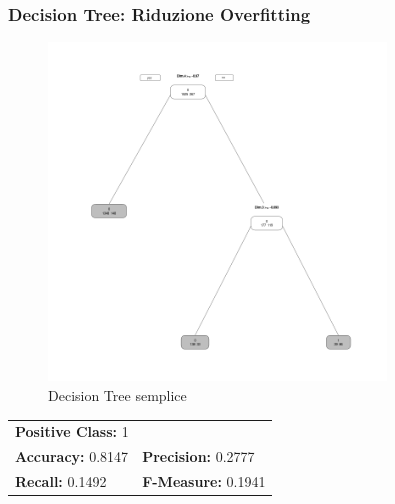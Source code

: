 \begin{frame}[fragile]
\frametitle{Decision Tree: Riduzione Overfitting}
\begin{minipage}{0.45\textwidth}
\begin{figure}
    \centering
    \includegraphics[width=0.8\textwidth]{Img/decision tree/D-TREE002.png}
    \caption{Decision Tree semplice}
    \label{fig:DTREE2}
\end{figure}
\end{minipage}%
\hspace{2em}
\begin{minipage}{0.45\textwidth}

\begin{table}[h!]
\centering
\begin{tabular}{ll}
\multicolumn{2}{l}{\textbf{Positive Class:} 1} \\
\textbf{Accuracy:} 0.8147 & \textbf{Precision:} 0.2777\\
\textbf{Recall:} 0.1492 & \textbf{F-Measure:} 0.1941
\end{tabular}
\end{table}

\end{minipage}%
\end{frame}

